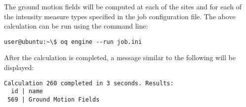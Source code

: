 The ground motion fields will be computed at each of the sites and for each of
the intensity measure types specified in the job configuration file. The
above calculation can be run using the command line:

\begin{verbatim}
user@ubuntu:~\$ oq engine --run job.ini
\end{verbatim}

After the calculation is completed, a message similar to the following will be
displayed:

\begin{verbatim}
Calculation 260 completed in 3 seconds. Results:
  id | name
 569 | Ground Motion Fields
\end{verbatim}

